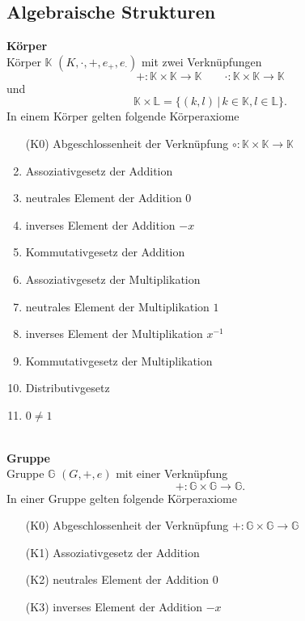 \documentclass[a4paper,12pt]{article}
\begin{document}
\subsection{Algebraische Strukturen}
\textbf{Körper}\\ 
Körper $\mathbb{K}$ $\left( K,\cdot ,+,e_{+},e_{\cdot }\right) $ mit zwei Verknüpfungen
\[ 
+:\mathbb{K}\times \mathbb{K}\rightarrow \mathbb{K}\qquad \cdot :\mathbb{K}\times \mathbb{K}\rightarrow \mathbb{K}
\] 
und 
\[ 
        \mathbb{K}\times \mathbb{L}=\{\left( k,l\right) \,|\, k \in \mathbb{K},l \in \mathbb{L}\}
.\] 
In einem Körper gelten folgende Körperaxiome
\begin{enumerate}[wide,label=(K\arabic*)]
        \item [(K0)] Abgeschlossenheit der Verknüpfung $\circ:\mathbb{K}\times \mathbb{K}\rightarrow \mathbb{K}$ 
        \item Assoziativgesetz der Addition
        \item neutrales Element der Addition $0$
        \item inverses Element der Addition $-x$ 
        \item Kommutativgesetz der Addition
        \item Assoziativgesetz der Multiplikation
        \item neutrales Element der Multiplikation $1$ 
        \item inverses Element der Multiplikation $x^{-1}$ 
        \item Kommutativgesetz der Multiplikation
        \item Distributivgesetz
        \item $0\neq 1$ 
\end{enumerate}
\hfill\\\textbf{Gruppe}\\ 
Gruppe $\mathbb{G}$ $\left( G,+,e\right) $  mit einer Verknüpfung
\[ 
+:\mathbb{G}\times \mathbb{G}\rightarrow \mathbb{G}
.\] 
In einer Gruppe gelten folgende Körperaxiome
\begin{enumerate}[wide,label=]
        \item[(K0)] Abgeschlossenheit der Verknüpfung $+:\mathbb{G}\times \mathbb{G}\rightarrow \mathbb{G}$ 
        \item[(K1)] Assoziativgesetz der Addition
        \item[(K2)] neutrales Element der Addition $0$ 
        \item[(K3)] inverses Element der Addition $-x$ 
\end{enumerate}
\end{document}
